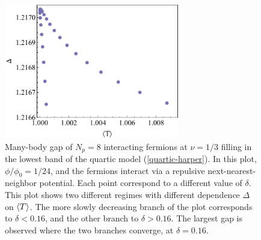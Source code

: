 \documentclass[aps,prb,twocolumn,letterpaper,twoside,nobalancelastpage,groupedaddress,amsmath,amssymb,floatfix,citeautoscript]{revtex4-1}
\begin{document}
\begin{figure}[thb]
\centering
\includegraphics[width=3.0in]{gap-v-trace-delta.pdf}
\caption{\label{gap-v-trace-delta-plot}Many-body gap of $N_p=8$ interacting fermions at $\nu=1/3$ filling in the lowest band of the quartic model (\ref{quartic-harper}). In this plot, $\phi/\phi_0=1/24$, and the fermions interact via a repulsive next-nearest-neighbor potential. Each point correspond to a different value of $\delta$. This plot shows two different regimes with different dependence $\Delta$ on $\expval{T}$. The more slowly decreasing branch of the plot corresponds to $\delta < 0.16$, and the other branch to $\delta > 0.16$. The largest gap is observed where the two branches converge, at $\delta = 0.16$.}
\end{figure}


\end{document}
